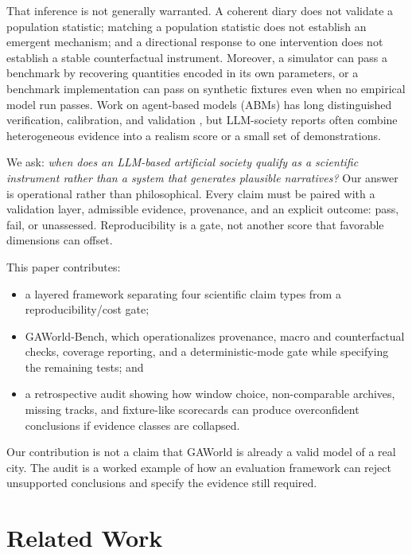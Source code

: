 \documentclass[letterpaper]{article}
\begin{document}
That inference is not generally warranted. A coherent diary does not validate a population statistic;
matching a population statistic does not establish an emergent mechanism; and a directional response to
one intervention does not establish a stable counterfactual instrument. Moreover, a simulator can pass a
benchmark by recovering quantities encoded in its own parameters, or a benchmark implementation can
pass on synthetic fixtures even when no empirical model run passes. Work on agent-based models (ABMs)
has long distinguished verification, calibration, and validation \cite{sargent2013verification,
fagiolo2007critical}, but LLM-society reports often combine heterogeneous evidence into a realism score
or a small set of demonstrations.

We ask: \emph{when does an LLM-based artificial society qualify as a scientific instrument rather than a
system that generates plausible narratives?} Our answer is operational rather than philosophical. Every
claim must be paired with a validation layer, admissible evidence, provenance, and an explicit outcome:
pass, fail, or unassessed. Reproducibility is a gate, not another score that favorable dimensions can
offset.

This paper contributes:
\begin{itemize}
    \item a layered framework separating four scientific claim types from a reproducibility/cost gate;
    \item GAWorld-Bench, which operationalizes provenance, macro and counterfactual checks, coverage
    reporting, and a deterministic-mode gate while specifying the remaining tests; and
    \item a retrospective audit showing how window choice, non-comparable archives, missing tracks, and
    fixture-like scorecards can produce overconfident conclusions if evidence classes are collapsed.
\end{itemize}

Our contribution is not a claim that GAWorld is already a valid model of a real city. The audit is a
worked example of how an evaluation framework can reject unsupported conclusions and specify the
evidence still required.

\section{Related Work}
\end{document}
